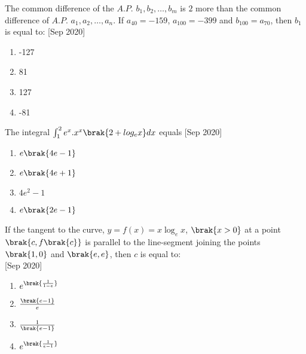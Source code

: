     \item{
     
            The common difference of the $A.P.$ $b_1, b_2, \ldots, b_m$ is $2$ more than the common difference of $A.P.$ $a_1, a_2, \ldots, a_n$. If $a_{40} = -159$, $a_{100} = -399$ and $b_{100} = a_{70}$, then $b_1$ is equal to:\hfill
                {[Sep 2020]}
            \begin{multicols}{4}
                \begin{enumerate}
                    \item -127
                    \item 81
                    \item 127
                    \item -81
                \end{enumerate}
            \end{multicols}
        
        }
    \item{
            The integral $\int_{1}^{2}e^{x}.x^{x}\brak{2+log_{e}x}dx$ equals
           	\hfill
                {[Sep 2020]}
            
            \begin{multicols}{2}
				\begin{enumerate}
					\item $e\brak{4e-1}$
					\item $e\brak{4e+1}$
					\item $4e^2-1$
					\item $e\brak{2e-1}$
				\end{enumerate}
			\end{multicols}
        
        }
 	\item{
        	If the tangent to the curve, $y = f(x) = x\log_e x$, $\brak{x>0}$ at a point $\brak{c,f\brak{c}}$ is parallel to the line-segment joining the points $\brak{1,0}$ and $\brak{e,e}$, then $c$ is equal to: \\ \text{ }
        	\hfill
        	{[Sep 2020]}
        	
        	\begin{multicols}{4}
        		\begin{enumerate}
					\item \( e^{\brak{\frac{1}{1-e}}} \)
					\item \( \frac{\brak{e-1}}{e} \)
					\item \( \frac{1}{\brak{e-1}} \)
					\item \( e^{\brak{\frac{1}{e-1}}} \)
        		\end{enumerate}
        	\end{multicols}
        	
        }
